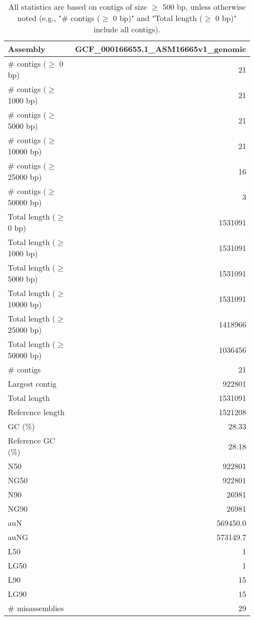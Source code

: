 \documentclass[12pt,a4paper]{article}
\begin{document}
\begin{table}[ht]
\begin{center}
\caption{All statistics are based on contigs of size $\geq$ 500 bp, unless otherwise noted (e.g., "\# contigs ($\geq$ 0 bp)" and "Total length ($\geq$ 0 bp)" include all contigs).}
\begin{tabular}{|l*{1}{|r}|}
\hline
Assembly & GCF\_000166655.1\_ASM16665v1\_genomic \\ \hline
\# contigs ($\geq$ 0 bp) & 21 \\ \hline
\# contigs ($\geq$ 1000 bp) & 21 \\ \hline
\# contigs ($\geq$ 5000 bp) & 21 \\ \hline
\# contigs ($\geq$ 10000 bp) & 21 \\ \hline
\# contigs ($\geq$ 25000 bp) & 16 \\ \hline
\# contigs ($\geq$ 50000 bp) & 3 \\ \hline
Total length ($\geq$ 0 bp) & 1531091 \\ \hline
Total length ($\geq$ 1000 bp) & 1531091 \\ \hline
Total length ($\geq$ 5000 bp) & 1531091 \\ \hline
Total length ($\geq$ 10000 bp) & 1531091 \\ \hline
Total length ($\geq$ 25000 bp) & 1418966 \\ \hline
Total length ($\geq$ 50000 bp) & 1036456 \\ \hline
\# contigs & 21 \\ \hline
Largest contig & 922801 \\ \hline
Total length & 1531091 \\ \hline
Reference length & 1521208 \\ \hline
GC (\%) & 28.33 \\ \hline
Reference GC (\%) & 28.18 \\ \hline
N50 & 922801 \\ \hline
NG50 & 922801 \\ \hline
N90 & 26981 \\ \hline
NG90 & 26981 \\ \hline
auN & 569450.0 \\ \hline
auNG & 573149.7 \\ \hline
L50 & 1 \\ \hline
LG50 & 1 \\ \hline
L90 & 15 \\ \hline
LG90 & 15 \\ \hline
\# misassemblies & 29 \\ \hline

\end{tabular}
\end{center}
\end{table}
\end{document}
